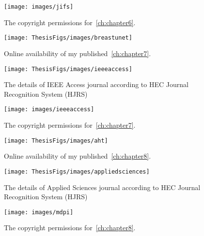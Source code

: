 \begin{figure}[!b]
	\centering
	\texttt{[image: images/jifs]}
	\caption{The copyright permissions for~\cref{ch:chapter6}.}
	\label{fig:jifs}
\end{figure}
\begin{figure}[!h]
	\centering
	\texttt{[image: ThesisFigs/images/breastunet]}
	\caption{Online availability of my published~\cref{ch:chapter7}.}
	\label{fig:lbpcnnnnnnn}
\end{figure}
\begin{figure}[!h]
	\centering
	\texttt{[image: ThesisFigs/images/ieeeaccess]}
	\caption{The details of IEEE Access journal according to HEC Journal Recognition System (HJRS)}
	\label{fig:lbpcnnnnnnn}
\end{figure}
\begin{figure}[!b]
	\centering
	\texttt{[image: images/ieeeaccess]}
	\caption{The copyright permissions for~\cref{ch:chapter7}.}
	\label{fig:ieeeaccess}
\end{figure}
\begin{figure}[!h]
	\centering
	\texttt{[image: ThesisFigs/images/aht]}
	\caption{Online availability of my published~\cref{ch:chapter8}.}
	\label{fig:lbpcnnnnnnn}
\end{figure}
\begin{figure}[!h]
	\centering
	\texttt{[image: ThesisFigs/images/appliedsciences]}
	\caption{The details of Applied Sciences journal according to HEC Journal Recognition System (HJRS)}
	\label{fig:lbpcnnnnnnn}
\end{figure}
\begin{figure}[t]
	\centering
	\texttt{[image: images/mdpi]}
	\caption{The copyright permissions for~\cref{ch:chapter8}.}
	\label{fig:mdpi}
\end{figure}